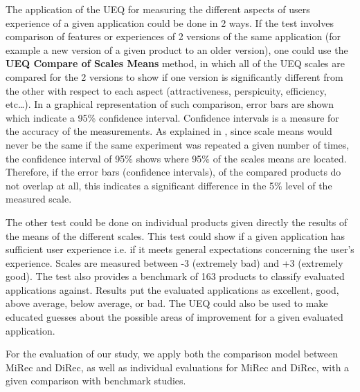 The application of the UEQ for measuring the different aspects of users
experience of a given application could be done in 2 ways. If the test involves
comparison of features or experiences of 2 versions of the same application
(for example a new version of a given product to an older version), one could
use the \textbf{UEQ Compare of Scales Means} method, in which all of the UEQ
scales are compared for the 2 versions to show if one version is significantly different
from the other with respect to each aspect (attractiveness, perspicuity,
efficiency, etc\ldots). In a graphical representation of such comparison,
error bars are shown which indicate a 95\% confidence interval. Confidence
intervals is a measure for the accuracy of the measurements. As explained in
\cite{UEQHandbook}, since scale means would never be the same if the same
experiment was repeated a given number of times, the confidence interval of 95\%
shows where 95\% of the scales means are located. Therefore, if the error bars
(confidence intervals), of the compared products do not overlap at all, this
indicates a significant difference in the 5\% level of the measured scale.\par
The other test could be done on individual products given directly the results
of the means of the different scales. This test could show if a given
application has sufficient user experience i.e. if it meets general
expectations concerning the user's experience. Scales are measured between -3
(extremely bad) and +3 (extremely good). The test also provides a benchmark of
163 products to classify evaluated applications against. Results put the
evaluated applications as excellent, good, above average, below average,
or bad. The UEQ could also be used to make educated guesses about the possible
areas of improvement for a given evaluated application.\par
For the evaluation of our study, we apply both the comparison model between
MiRec and DiRec, as well as individual evaluations for MiRec and DiRec, with a
given comparison with benchmark studies.
